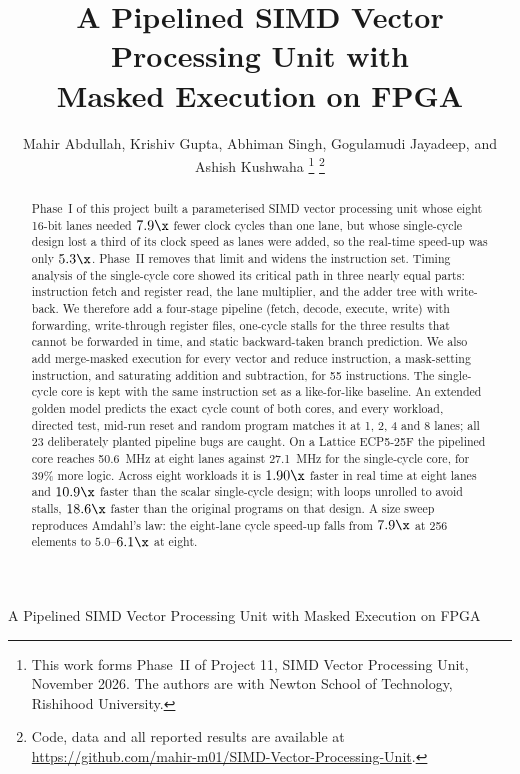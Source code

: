 \title{A Pipelined SIMD Vector Processing Unit with\\Masked Execution on FPGA}

\author{Mahir Abdullah, Krishiv Gupta, Abhiman Singh, Gogulamudi Jayadeep, and Ashish Kushwaha%
\thanks{This work forms Phase~II of Project 11, SIMD Vector Processing Unit, November 2026.
The authors are with Newton School of Technology, Rishihood University.}%
\thanks{Code, data and all reported results are available at
\url{https://github.com/mahir-m01/SIMD-Vector-Processing-Unit}.}}

%
{A Pipelined SIMD Vector Processing Unit with Masked Execution on FPGA}

\maketitle

\begin{abstract}
Phase~I of this project built a parameterised SIMD vector processing unit whose
eight 16-bit lanes needed $7.9\x$ fewer clock cycles than one lane, but whose
single-cycle design lost a third of its clock speed as lanes were added, so the
real-time speed-up was only $5.3\x$. Phase~II removes that limit and widens the
instruction set. Timing analysis of the single-cycle core showed its critical
path in three nearly equal parts: instruction fetch and register read, the lane
multiplier, and the adder tree with write-back. We therefore add a four-stage
pipeline (fetch, decode, execute, write) with forwarding, write-through register
files, one-cycle stalls for the three results that cannot be forwarded in time,
and static backward-taken branch prediction. We also add merge-masked execution
for every vector and reduce instruction, a mask-setting instruction, and
saturating addition and subtraction, for 55 instructions. The single-cycle core
is kept with the same instruction set as a like-for-like baseline. An extended
golden model predicts the exact cycle count of both cores, and every workload,
directed test, mid-run reset and random program matches it at 1, 2, 4 and 8
lanes; all 23 deliberately planted pipeline bugs are caught. On a Lattice
ECP5-25F the pipelined core reaches 50.6~MHz at eight lanes against 27.1~MHz for
the single-cycle core, for 39\% more logic. Across eight workloads it is
$1.90\x$ faster in real time at eight lanes and $10.9\x$ faster than the scalar
single-cycle design; with loops unrolled to avoid stalls, $18.6\x$ faster than
the original programs on that design. A size sweep reproduces Amdahl's law: the eight-lane cycle speed-up
falls from $7.9\x$ at 256 elements to $5.0$--$6.1\x$ at eight.
\end{abstract}

